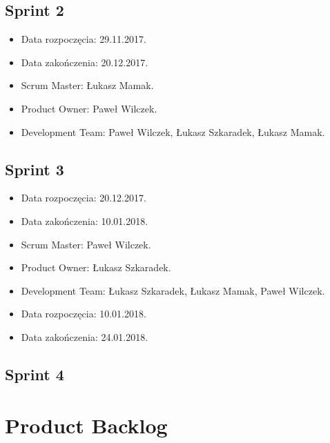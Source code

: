 \documentclass[a4paper]{article} \usepackage{polski} \usepackage[cp1250]{inputenc} \usepackage{url}
\begin{document}
\subsection{Sprint 2}


\begin{itemize} \item Data rozpoczęcia: 29.11.2017. \item Data zakończenia: 20.12.2017. \item Scrum Master: Łukasz Mamak. \item Product Owner: Paweł Wilczek. \item Development Team: Paweł Wilczek, Łukasz Szkaradek, Łukasz Mamak. \end{itemize}

\subsection{Sprint 3}


\begin{itemize} \item Data rozpoczęcia: 20.12.2017. \item Data zakończenia: 10.01.2018. \item Scrum Master: Paweł Wilczek. \item Product Owner: Łukasz Szkaradek. \item Development Team: Łukasz Szkaradek, Łukasz Mamak, Paweł Wilczek. \end{itemize}


\begin{itemize} \item Data rozpoczęcia: 10.01.2018. \item Data zakończenia: 24.01.2018. \end{itemize}

\subsection{Sprint 4}


\section{Product Backlog}
\end{document}
